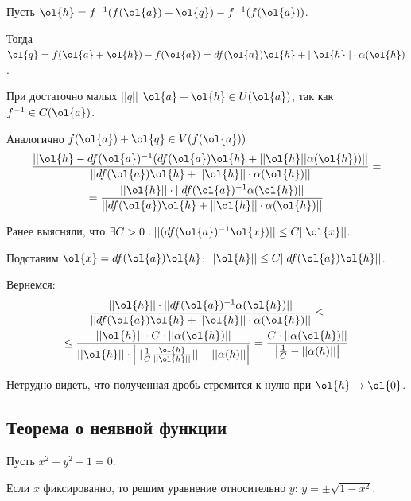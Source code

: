 Пусть \( \ol{h} = f^{-1} ( f(\ol{a}) + \ol{q} ) - f^{-1} ( f(\ol{a}) ) \).

Тогда \( \ol{q} = f(\ol{a} + \ol{h}) - f(\ol{a}) = df(\ol{a}) \ol{h} + || \ol{h} || \cdot \alpha ( \ol{h} ) \).

При достаточно малых \( || q || \) \( \ol{a} + \ol{h} \in U(\ol{a}) \), так как \( f^{-1} \in C(\ol{a}) \).

Аналогично \( f(\ol{a}) + \ol{q} \in V(f(\ol{a})) \)
\begin{gather*}
    \frac
    {|| \ol{h} - df(\ol{a})^{-1} (df(\ol{a}) \ol{h} + || \ol{h} || \alpha ( \ol{h} )) ||}
    {|| df(\ol{a}) \ol{h} + || \ol{h} || \cdot \alpha ( \ol{h} ) ||}
    =
    \\
    =
    \frac
    {|| \ol{h} || \cdot || df(\ol{a})^{-1} \alpha(\ol{h}) || }
    {|| df(\ol{a}) \ol{h} + || \ol{h} || \cdot \alpha ( \ol{h} ) ||}
\end{gather*}

Ранее выясняли, что \( \exists C > 0 : || (df (\ol{a})^{-1} \ol{x} ) || \leq C || \ol{x} || \).

Подставим \( \ol{x} = df (\ol{a}) \ol{h} \): \( || \ol{h} || \leq C || df(\ol{a}) \ol{h} || \).

Вернемся:
\begin{gather*}
    \frac
    {|| \ol{h} || \cdot || df(\ol{a})^{-1} \alpha(\ol{h}) ||}
    {|| df(\ol{a}) \ol{h} + || \ol{h} || \cdot \alpha ( \ol{h} ) ||}
    \leq
    \\
    \leq
    \frac
    {|| \ol{h} || \cdot C \cdot || \alpha(\ol{h}) ||}
    {|| \ol{h} || \cdot \left| || \frac{1}{C} \frac{\ol{h}}{|| \ol{h} ||} || - || \alpha(h) || \right| }
    =
    \frac
    {C \cdot || \alpha(\ol{h}) ||}
    {\left|\frac{1}{C} - || \alpha(h) || \right| }
\end{gather*}

Нетрудно видеть, что полученная дробь стремится к нулю при \( \ol{h} \to \ol{0} \).

\subsection{Теорема о неявной функции}

\begin{example}{}{}
    Пусть \( x^2 + y^2 - 1 = 0 \).

    Если \( x \) фиксированно, то решим уравнение относительно \( y \): \( y = \pm \sqrt{1 - x^2} \).
\end{example}

